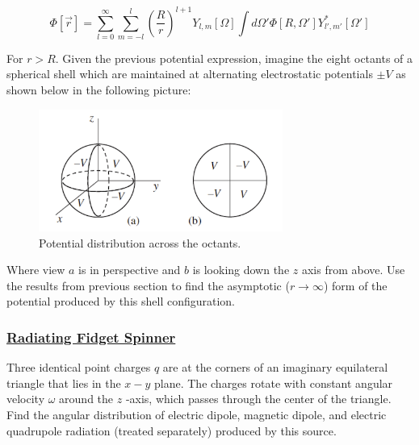 \begin{equation}
	\Phi[\vec{r}] = \sum_{l=0}^{\infty} \sum_{m=-l}^{l} \left(\frac{R}{r}\right)^{l+1} Y_{l,m} [\Omega]\int d \Omega ' \Phi [R, \Omega '] Y^{*}_{l',m'}[\Omega ']
\end{equation}

For $r > R$. Given the previous potential expression, imagine the eight octants of a spherical shell which are maintained at alternating electrostatic potentials  $\pm V$ as shown below in the following picture:

\begin{figure}[htbp!]
	\includegraphics[width=8cm]{figures/shells.png}
	\centering
	\caption{Potential distribution across the octants.}
\end{figure}

Where view $a$ is in perspective and $b$ is looking down the $z$ axis from above. Use the results from previous section to find the asymptotic ($r \rightarrow \infty$) form of the potential produced by this shell configuration.

\subsubsection{\hyperref[Radiating Fidget Spinner]{Radiating Fidget Spinner}}

Three identical point charges $q$ are at the corners of an imaginary equilateral triangle that lies in the $x-y$ plane. The charges rotate with constant angular velocity $\omega$ around the $z$ -axis, which passes through the center of the triangle. Find the angular distribution of electric dipole, magnetic dipole, and electric quadrupole radiation (treated separately) produced by this source.

